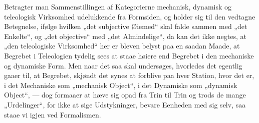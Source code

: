\documentclass[11pt]{book}
\begin{document}
Betragter man Sammenstillingen af Kategorierne mechanisk, dynamisk og
teleologisk Virksomhed udelukkende fra Formsiden, og holder sig til den
vedtagne Betegnelse, ifølge hvilken „det subjective Øiemed“ skal falde
sammen med „det Enkelte“, og „det objective“ med „det Almindelige“, da
kan det ikke negtes, at „den teleologiske Virksomhed“ her er bleven
belyst paa en saadan Maade, at Begrebet i Teleologien tydelig sees at
staae høiere end Begrebet i den mechaniske og dynamiske Form. Men naar
det saa skal undersøges, hvorledes det egentlig gaaer til, at Begrebet,
skjøndt det synes at forblive paa hver Station, hvor det er, i det
Mechaniske som „mechanisk Object“, i det Dynamiske som „dynamisk
Object“, --- dog formaaer at hæve sig opad fra Trin til Trin og trods de
mange „Urdelinger“, for ikke at sige Udstykninger, bevare Eenheden med
sig selv, saa staae vi igjen ved Formalismen.
\end{document}
